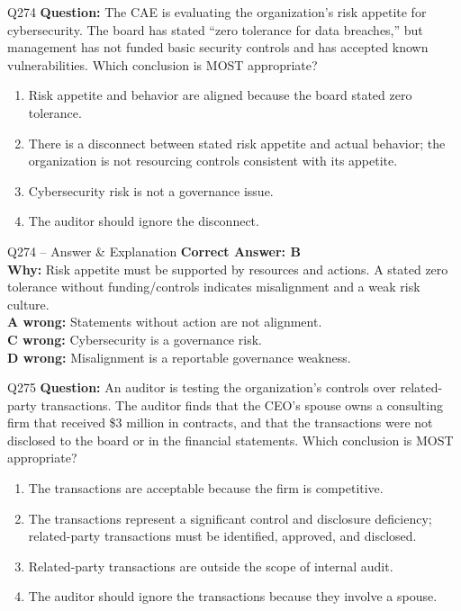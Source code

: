 \documentclass[aspectratio=169,10pt]{beamer}
\begin{document}
	\begin{frame}[t]{Q274}
		\small
		\textbf{Question:} The CAE is evaluating the organization's risk appetite for cybersecurity. The board has stated ``zero tolerance for data breaches,'' but management has not funded basic security controls and has accepted known vulnerabilities. Which conclusion is MOST appropriate?
		\begin{enumerate}[label=\Alph*.,itemsep=1pt,topsep=2pt]
			\item Risk appetite and behavior are aligned because the board stated zero tolerance.
			\item There is a disconnect between stated risk appetite and actual behavior; the organization is not resourcing controls consistent with its appetite.
			\item Cybersecurity risk is not a governance issue.
			\item The auditor should ignore the disconnect.
		\end{enumerate}
	\end{frame}
	
	\begin{frame}[t]{Q274 -- Answer \& Explanation}
		\small
		\textbf{Correct Answer: B} \\[4pt]
		\textbf{Why:} Risk appetite must be supported by resources and actions. A stated zero tolerance without funding/controls indicates misalignment and a weak risk culture. \\[4pt]
		\textbf{A wrong:} Statements without action are not alignment. \\[2pt]
		\textbf{C wrong:} Cybersecurity is a governance risk. \\[2pt]
		\textbf{D wrong:} Misalignment is a reportable governance weakness.
	\end{frame}
	
	\begin{frame}[t]{Q275}
		\small
		\textbf{Question:} An auditor is testing the organization's controls over related-party transactions. The auditor finds that the CEO's spouse owns a consulting firm that received \$3 million in contracts, and that the transactions were not disclosed to the board or in the financial statements. Which conclusion is MOST appropriate?
		\begin{enumerate}[label=\Alph*.,itemsep=1pt,topsep=2pt]
			\item The transactions are acceptable because the firm is competitive.
			\item The transactions represent a significant control and disclosure deficiency; related-party transactions must be identified, approved, and disclosed.
			\item Related-party transactions are outside the scope of internal audit.
			\item The auditor should ignore the transactions because they involve a spouse.
		\end{enumerate}
	\end{frame}
	
\end{document}
